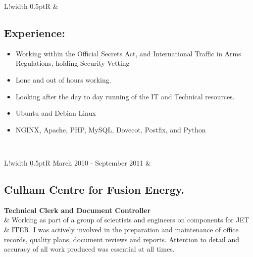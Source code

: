 \documentclass[a4paper]{article}
\newcommand{\jobtitle}[1]{\textbf{#1}}
\newcommand\VRule{\color{lightgray}\vrule width 0.5pt}
\begin{document}
\begin{tabularx}{\textwidth}{L!{\VRule}R}
    & \subsection{Experience:}
    \begin{itemize}
        \item Working within the Official Secrets Act, and International Traffic in Arms Regulations, holding Security Vetting
        \item Lone and out of hours working.
        \item Looking after the day to day running of the IT and Technical resources.
        \item Ubuntu and Debian Linux
        \item NGINX, Apache, PHP, MySQL, Dovecot, Postfix, and Python
     \end{itemize} \\
\end{tabularx}


\begin{tabularx}{\textwidth}{L!{\VRule}R}
    March 2010 - September 2011
    & \subsection{Culham Centre for Fusion Energy.}
    \jobtitle{Technical Clerk and Document Controller} \\
    & Working as part of a group of scientists and engineers on components for JET \& ITER. I was actively involved in the preparation and maintenance of office records, quality plans, document reviews and reports. Attention to detail and accuracy of all work produced was essential at all times. \\
\end{tabularx}
\end{document}
